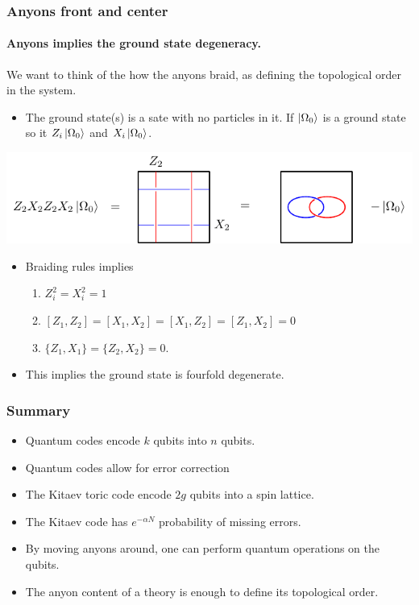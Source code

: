 \documentclass{beamer}
\renewcommand{\(}{\left(}
\renewcommand{\)}{\right)}
\renewcommand{\[}{\left[}
\renewcommand{\]}{\right]}
\begin{document}
\begin{frame}
    \frametitle{Anyons front and center}
    \framesubtitle{Anyons implies the ground state degeneracy.}

    \begin{framed}
        We want to think of the how the anyons braid, as defining the topological order in the system.
    \end{framed}
    \begin{itemize}
        \item The ground state(s) is a sate with no particles in it. If $\ket{\Omega_0}$ is a ground state so it $Z_i \ket{\Omega_0}$ and $X_i \ket{\Omega_0}$.
    \end{itemize}
    \includegraphics[scale=0.9]{anyons_ground_state.pdf}
    \begin{itemize}
        \item Braiding rules implies \begin{enumerate}
            \item $Z_i^2 = X_i^2 = 1$
            \item $\[Z_1, Z_2 \] = \[X_1, X_2 \] = \[X_1, Z_2 \] = \[Z_1, X_2 \] = 0$
            \item $\{Z_1, X_1 \} = \{Z_2, X_2 \} = 0$.
        \end{enumerate}
        \item This implies the ground state is fourfold degenerate. 
    \end{itemize}
    
    
\end{frame}

\begin{frame}
    \frametitle{Summary}

    \begin{itemize}
        \item Quantum codes encode $k$ qubits into $n$ qubits. 
        \item Quantum codes allow for error correction 
        \item The Kitaev toric code encode $2g$ qubits into a spin lattice.  
        \item The Kitaev code has $e^{-\alpha N}$ probability of missing errors. 
        \item By moving anyons around, one can perform quantum operations on the qubits. 
        \item The anyon content of a theory is enough to define its topological order.
    \end{itemize}

\end{frame}




\end{document}
